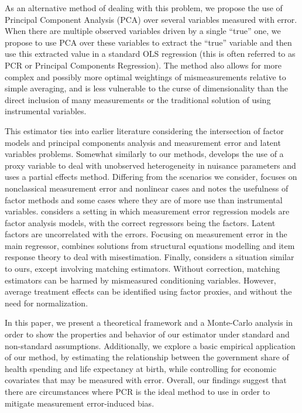 \documentclass[10pt]{article}
\begin{document}
        As an alternative method of dealing with this problem, we propose the use of Principal Component Analysis (PCA) over several variables measured with error. When there are multiple observed variables driven by a single ``true'' one, we propose to use PCA over these variables to extract the ``true'' variable and then use this extracted value in a standard OLS regression (this is often referred to as PCR or Principal Components Regression). The method also allows for more complex and possibly more optimal weightings of mismeasurements relative to simple averaging, and is less vulnerable to the curse of dimensionality than the direct inclusion of many measurements or the traditional solution of using instrumental variables.

        This estimator ties into earlier literature considering the intersection of factor models and principal components analysis and measurement error and latent variables problems. Somewhat similarly to our methods, \cite{nagasawa_identication_2020} develops the use of a proxy variable to deal with unobserved heterogeneity in nuisance parameters and uses a partial effects method. Differing from the scenarios we consider, \cite{schennach_recent_2016} focuses on nonclassical measurement error and nonlinear cases and notes the usefulness of factor methods and some cases where they are of more use than instrumental variables. \cite{wegge_local_1996} considers a setting in which measurement error regression models are factor analysis models, with the correct regressors being the factors. Latent factors are uncorrelated with the errors. Focusing on measurement error in the main regressor, \cite{schofield_correcting_2015} combines solutions from structural equations modelling and item response theory to deal with misestimation. Finally, \cite{heckman_matching_2010} considers a situation similar to ours, except involving matching estimators. Without correction, matching estimators can be harmed by mismeasured conditioning variables. However, average treatment effects can be identified using factor proxies, and without the need for normalization.

        In this paper, we present a theoretical framework and a Monte-Carlo analysis in order to show the properties and behavior of our estimator under standard and non-standard assumptions. Additionally, we explore a basic empirical application of our method, by estimating the relationship between the government share of health spending and life expectancy at birth, while controlling for economic covariates that may be measured with error. Overall, our findings suggest that there are circumstances where PCR is the ideal method to use in order to mitigate measurement error-induced bias.
\end{document}
